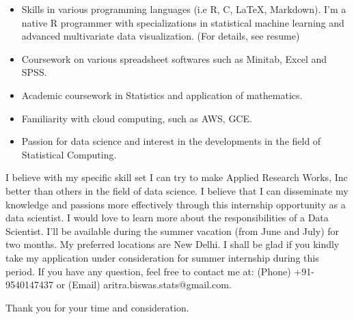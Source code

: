 \documentclass[11pt,a4paper,sans]{moderncv}        %
\begin{document}
\begin{itemize}
\item Skills in various programming languages (i.e R, C, LaTeX, Markdown). I'm a native R programmer with specializations in statistical machine learning 
and advanced multivariate data visualization. (For details, see resume)

\item Coursework on various spreadsheet softwares such as Minitab, Excel and SPSS.

\item Academic coursework in Statistics and application of mathematics.

\item Familiarity with cloud computing, such as AWS, GCE.

\item Passion for data science and interest in the developments in the field of Statistical Computing. \newline
\end{itemize}


I believe with my specific skill set I can try to make Applied Research Works, Inc better than others in the field of data science. I believe that I can 
disseminate my knowledge and passions more effectively through this internship opportunity as a data scientist. I would love to learn more about the responsibilities 
of a Data Scientist. I’ll be available during the summer vacation (from June and July) for two months. My preferred locations are New Delhi. I shall be glad 
if you kindly take my application under consideration for summer internship during this period.  If you have any question, feel free to contact me at:
(Phone) +91-9540147437 or (Email) aritra.biswas.stats@gmail.com.  \newline

Thank you for your time and consideration. \newline 


\makeletterclosing

\end{document}
